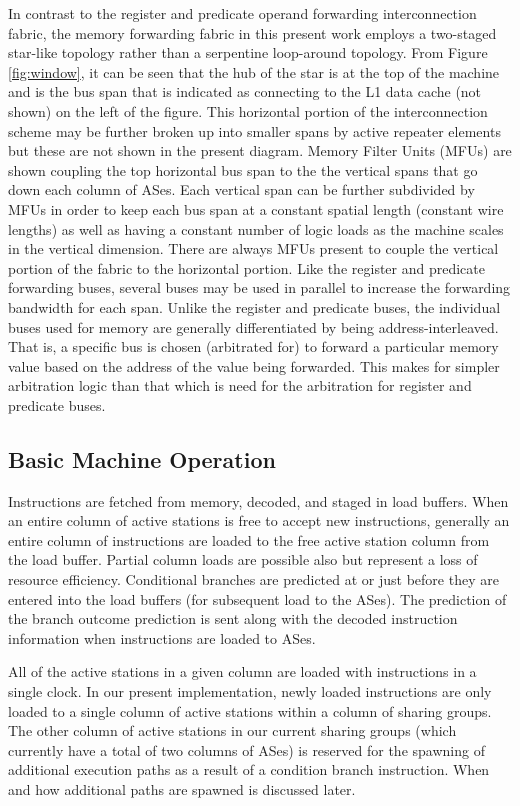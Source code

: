 \documentclass[10pt,dvips]{article}
\begin{document}
In contrast to the register and predicate operand forwarding 
interconnection fabric,
the memory forwarding fabric in this present work employs
a two-staged star-like topology rather than a serpentine
loop-around topology.
From 
Figure \ref{fig:window}, it can be seen that
the hub of the star is at the top
of the machine and is the bus span that is indicated as
connecting to the L1 data cache (not shown) on the left of
the figure.  This horizontal portion of the interconnection
scheme may be further broken up into smaller spans by
active repeater elements but these are not shown in the present
diagram.  Memory Filter Units (MFUs) are shown coupling the
top horizontal bus span to the the vertical spans that
go down each column of ASes.  Each vertical span can be
further subdivided by MFUs in order to keep each bus span
at a constant spatial length (constant wire lengths) as
well as having a constant number of logic loads as the machine
scales in the vertical dimension.
There are always MFUs present to couple the vertical portion
of the fabric to the horizontal portion.
Like the register and predicate forwarding buses,
several buses may be used in parallel to increase the
forwarding bandwidth for each span.
Unlike the register and predicate buses, the individual
buses used for memory are generally differentiated
by being address-interleaved.  That is, a specific bus
is chosen (arbitrated for) to forward a particular memory
value based on the address of the value being forwarded.
This makes for simpler arbitration logic than that which
is need for the arbitration for register and predicate buses.
%
%
\subsection{Basic Machine Operation}
%
Instructions are fetched from memory, decoded, and staged in 
load buffers.
When an entire column
of active stations is free to accept new instructions, generally
an entire column of instructions are loaded to the free active station
column from the load buffer.  Partial column loads are possible
also but represent a loss of resource efficiency.
Conditional branches are
predicted at or just before they are entered into the load buffers
(for subsequent load to the ASes).
The prediction of the branch outcome 
prediction is sent along with the
decoded instruction information when instructions are 
loaded to ASes.

All of the active stations in a given column are loaded with 
instructions in a single clock.  
In our present implementation, newly loaded instructions
are only loaded to a single column of active stations within
a column of sharing groups.  The other column of active stations
in our current sharing groups (which currently have a total
of two columns of ASes) is reserved for the spawning of additional
execution paths as a result of a condition branch instruction.
When and how additional paths are spawned is discussed later.
\end{document}
